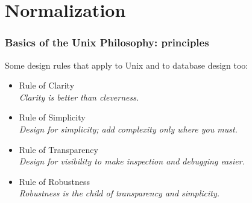 \documentclass[xcolor=dvipsnames]{beamer}
\begin{document}
\section{Normalization}

{
 
  \begin{frame}
  \end{frame}
}

\begin{frame}[fragile]
  \frametitle{Basics of the Unix Philosophy: principles}

  Some design rules that apply to Unix and to database design too:
  
  \begin{itemize}
  \item Rule of Clarity \\
    \textit{Clarity is better than cleverness.}
  \item Rule of Simplicity \\
    \textit{Design for simplicity; add complexity only where you must.}
  \item Rule of Transparency \\
    \textit{Design for visibility to make inspection and debugging easier.}
  \item Rule of Robustness \\
    \textit{Robustness is the child of transparency and simplicity.}
  \end{itemize}
\end{frame}
\end{document}
